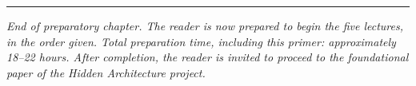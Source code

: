 \documentclass[11pt,a4paper]{book}
\theoremstyle{cleanrm}
\begin{document}
\vspace{2em}
\hrule
\vspace{1em}
\noindent\textit{End of preparatory chapter. The reader is now
prepared to begin the five lectures, in the order given. Total
preparation time, including this primer: approximately 18--22 hours.
After completion, the reader is invited to proceed to the
foundational paper of the Hidden Architecture project.}
\end{document}
